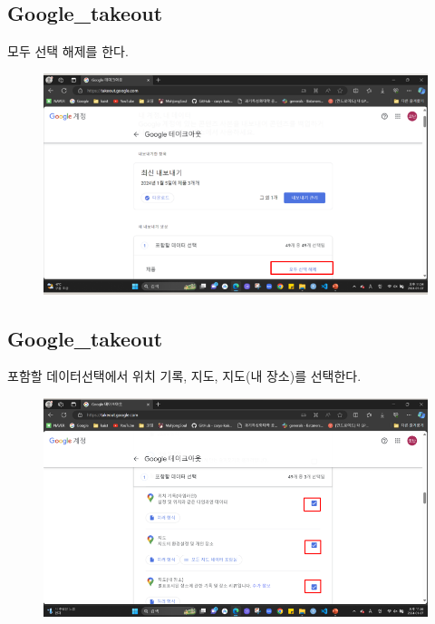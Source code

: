 \documentclass{oblivoir}
\begin{document}
  \subsection{Google\_takeout}
  모두 선택 해제를 한다.
  \begin{figure}[H]
    \includegraphics[width=\textwidth]{Google_takeout_2.png}
  \end{figure}
  \subsection{Google\_takeout}
  포함할 데이터선택에서 위치 기록, 지도, 지도(내 장소)를 선택한다.
  \begin{figure}[H]
    \includegraphics[width=\textwidth]{Google_takeout_3.png}
  \end{figure}      
\end{document}
